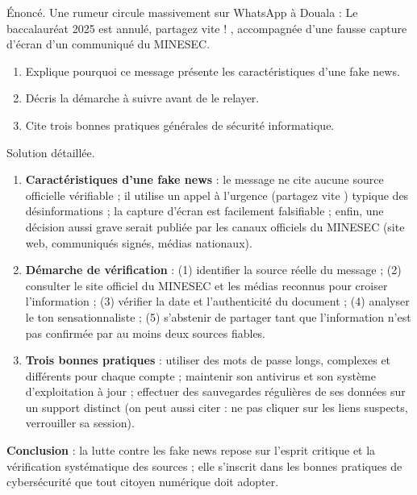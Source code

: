 \documentclass[11pt]{article}
\begin{document}
\begin{exoresolu}
Énoncé. Une rumeur circule massivement sur WhatsApp à Douala : \og Le baccalauréat 2025 est annulé, partagez vite ! \fg, accompagnée d'une fausse capture d'écran d'un communiqué du MINESEC.
\begin{enumerate}
  \item Explique pourquoi ce message présente les caractéristiques d'une fake news.
  \item Décris la démarche à suivre avant de le relayer.
  \item Cite trois bonnes pratiques générales de sécurité informatique.
\end{enumerate}
\tcblower
Solution détaillée.
\begin{enumerate}
  \item \textbf{Caractéristiques d'une fake news} : le message ne cite aucune source officielle vérifiable ; il utilise un appel à l'urgence (\og partagez vite \fg) typique des désinformations ; la capture d'écran est facilement falsifiable ; enfin, une décision aussi grave serait publiée par les canaux officiels du MINESEC (site web, communiqués signés, médias nationaux).
  \item \textbf{Démarche de vérification} : (1) identifier la source réelle du message ; (2) consulter le site officiel du MINESEC et les médias reconnus pour croiser l'information ; (3) vérifier la date et l'authenticité du document ; (4) analyser le ton sensationnaliste ; (5) s'abstenir de partager tant que l'information n'est pas confirmée par au moins deux sources fiables.
  \item \textbf{Trois bonnes pratiques} : utiliser des mots de passe longs, complexes et différents pour chaque compte ; maintenir son antivirus et son système d'exploitation à jour ; effectuer des sauvegardes régulières de ses données sur un support distinct (on peut aussi citer : ne pas cliquer sur les liens suspects, verrouiller sa session).
\end{enumerate}
\textbf{Conclusion} : la lutte contre les fake news repose sur l'esprit critique et la vérification systématique des sources ; elle s'inscrit dans les bonnes pratiques de cybersécurité que tout citoyen numérique doit adopter.
\end{exoresolu}
\end{document}
